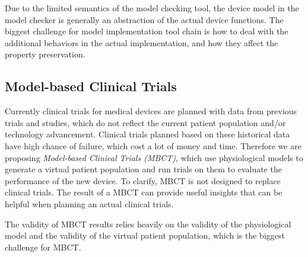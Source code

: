 \documentclass[a4paper]{article}
\begin{document}
Due to the limited semantics of the model checking tool, the device model in the model checker is generally an abstraction of the actual device functions.
The biggest challenge for model implementation tool chain is how to deal with the additional behaviors in the actual implementation, and how they affect the property preservation.
\subsection{Model-based Clinical Trials}
Currently clinical trials for medical devices are planned with data from previous trials and studies, which do not reflect the current patient population and/or technology advancement.
Clinical trials planned based on these historical data have high chance of failure, which cost a lot of money and time.
Therefore we are proposing \emph{Model-based Clinical Trials (MBCT)}, which use physiological models to generate a virtual patient population and run trials on them to evaluate the performance of the new device.
To clarify, MBCT is not designed to replace clinical trials.
The result of a MBCT can provide useful insights that can be helpful when planning an actual clinical trials.

The validity of MBCT results relies heavily on the validity of the physiological model and the validity of the virtual patient population, which is the biggest challenge for MBCT.
\end{document}
